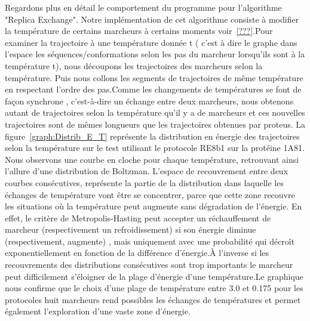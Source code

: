 Regardons plus en détail le comportement du programme pour l'algorithme "Replica Exchange". Notre implémentation de cet algorithme consiste à modifier la température de certains marcheurs à certains moments voir~\ref{???}.Pour examiner la trajectoire à une température donnée t ( c'est à dire le graphe dans l'espace les séquences/conformations selon les pas du marcheur lorsqu'ils sont à la température t), nous découpons les trajectoires des marcheurs  selon la température. Puis nous collons les segments de trajectoires de même température en respectant l'ordre des pas.Comme les changements de températures se font de façon synchrone , c’est-à-dire un échange entre deux marcheurs, nous obtenons autant de trajectoires selon la température qu'il y a de marcheurs et ces nouvelles trajectoires sont de mêmes longueurs que les trajectoires obtenues par proteus. La figure~\ref{graph:Distrib_E_T} représente la distribution en énergie des trajectoires selon la température sur le test utilisant le protocole RE8b1 sur la protéine 1A81. Nous observons une courbe en cloche pour chaque température, retrouvant ainsi l'allure d'une distribution de Boltzman.  L'espace de recouvrement entre deux courbes consécutives, représente la partie de la distribution dans laquelle les échanges de température vont être se concentrer, parce que cette zone recouvre les situations où la température peut augmente sans dégradation de l'énergie. En effet, le critère de Metropolis-Hasting peut accepter un réchauffement de marcheur (respectivement un refroidissement) si son énergie diminue  (respectivement, augmente) , mais uniquement avec une probabilité qui décroît exponentiellement en fonction de la différence d'énergie.À l'inverse si les recouvrements des distributions consécutives sont trop importants le marcheur peut difficilement s'éloigner de la plage d'énergie d'une température.Le graphique nous confirme que le choix d'une plage de température entre 3.0 et 0.175 pour les protocoles huit marcheurs rend possibles les échanges de températures et permet également l'exploration d'une vaste zone d'énergie.   




